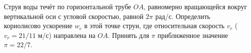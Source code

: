 Струя воды течёт по горизонтальной трубе $OA$,
равномерно вращающейся вокруг вертикальной оси
с угловой скоростью, равной $2\pi$ рад/с.
Определить кориолисово ускорение $w_c$ в этой точке струи,
где относительная скорость $v_r$ ($v_r = 21/11$ м/с)
направлена на $OA$.
Принять для $\pi$ приближенное значение $\pi = 22/7$.
